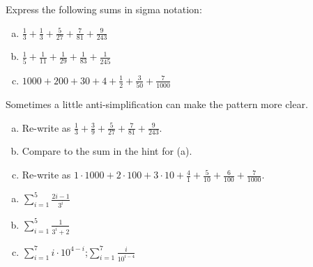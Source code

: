 \begin{question}
Express the following sums in sigma notation:
\begin{enumerate}[(a)]
\item $\frac{1}{3}+\frac{1}{3}+\frac{5}{27}+\frac{7}{81}+\frac{9}{243}$
\item $\frac{1}{5}+\frac{1}{11}+\frac{1}{29}+\frac{1}{83}+\frac{1}{245}$
\item $1000+200+30+4+\frac{1}{2}+\frac{3}{50}+\frac{7}{1000}$
\end{enumerate}
\end{question}
\begin{hint}
Sometimes a little anti-simplification can make the pattern more clear.
\begin{enumerate}[(a)]
\item Re-write as $\frac{1}{3}+\frac{3}{9}+\frac{5}{27}+\frac{7}{81}+\frac{9}{243}$.
\item Compare to the sum in the hint for (a).
\item Re-write as $1\cdot1000+2\cdot 100+3\cdot10+\frac{4}{1}+\frac{5}{10}+\frac{6}{100}+\frac{7}{1000}$.
\end{enumerate}
\end{hint}
\begin{answer}
\begin{enumerate}[(a)]
\item $\displaystyle\sum_{i=1}^5 \frac{2i-1}{3^i}$
\item $\displaystyle\sum_{i=1}^5 \frac{1}{3^i+2}$
\item $\displaystyle\sum_{i=1}^7 i\cdot10^{4-i}$\quad;\quad $\displaystyle\sum_{i=1}^7 \frac{i}{10^{i-4}}$
\end{enumerate}
\end{answer}
